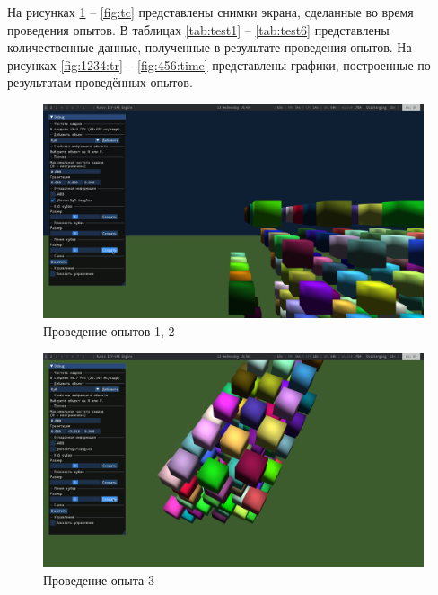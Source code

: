 На рисунках \ref{fig:cst} -- \ref{fig:tc} представлены снимки экрана, сделанные во время проведения опытов.
В таблицах \ref{tab:test1} -- \ref{tab:test6} представлены количественные данные, полученные в результате проведения опытов.
На рисунках \ref{fig:1234:tr} -- \ref{fig:456:time} представлены графики, построенные по результатам проведённых опытов.

\newpage

\begin{figure}[H]
	\centering
    \includegraphics[width=\textwidth]{img/cube-static-triangles.png}
	\caption{Проведение опытов 1, 2}
	\label{fig:cst}
\end{figure}

\begin{figure}[H]
	\centering
    \includegraphics[width=\textwidth]{img/cube-collision.png}
	\caption{Проведение опыта 3}
	\label{fig:cc}
\end{figure}

